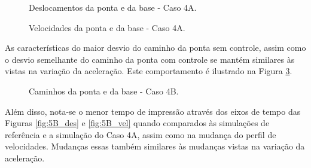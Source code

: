 \begin{figure}[H]
    \centering
    \hfill
    \caption{Deslocamentos da ponta e da base - Caso 4A.}
    \label{fig:5A_des}
\end{figure}

\begin{figure}[H]
    \centering
    \hfill
    \caption{Velocidades da ponta e da base - Caso 4A.}
    \label{fig:5A_vel}
\end{figure}

As características do maior desvio do caminho da ponta sem controle, assim como o desvio semelhante do caminho da ponta com controle se mantém similares às vistas na variação da aceleração.
Este comportamento é ilustrado na Figura \ref{fig:5B_cam}.

\begin{figure}[H]
    \centering
    \hfill
    \hfill
    \hfill
    \caption{Caminhos da ponta e da base - Caso 4B.}
    \label{fig:5B_cam}
\end{figure}
Além disso, nota-se o menor tempo de impressão através dos eixos de tempo das Figuras \ref{fig:5B_des} e \ref{fig:5B_vel} quando comparados às simulações de referência e a simulação do Caso 4A, assim como na mudança do perfil de velocidades. Mudanças essas também similares às mudanças vistas na variação da aceleração.

